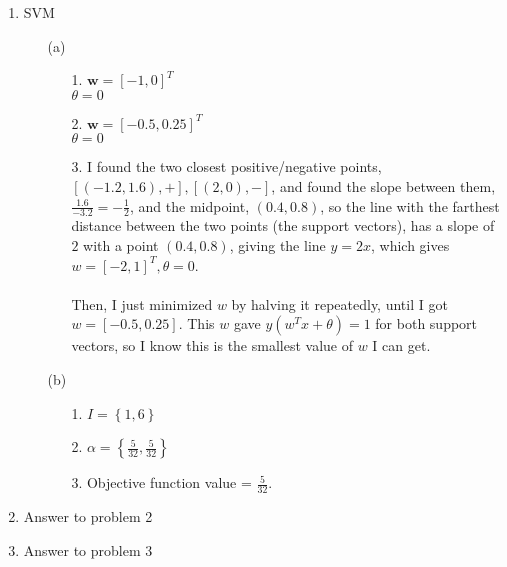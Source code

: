 

\oddsidemargin 0in
\evensidemargin 0in
\textwidth 6.5in
\topmargin -0.5in
\textheight 9.0in




\pagestyle{myheadings}  %

\begin{enumerate}
\item SVM
  \begin{enumerate}
  \item [(a)]
    \begin{enumerate}  
    \item [1.]
      $\textbf{w} = [-1,0]^T$\\
      $\theta = 0$
    \item [2.]
      $\textbf{w} = [-0.5,0.25]^T$\\
      $\theta = 0$
    \item [3.]
      I found the two closest positive/negative points, $[(-1.2,1.6), +], [(2,0), -]$, and found the slope between them, $\frac{1.6}{-3.2} = -\frac{1}{2}$, and the midpoint, $(0.4, 0.8)$, so the line with the farthest distance between the two points (the support vectors), has a slope of $2$ with a point $(0.4, 0.8)$, giving the line $y=2x$, which gives $w=[-2,1]^T, \theta=0$.\\\\
      Then, I just minimized $w$ by halving it repeatedly, until I got $w=[-0.5,0.25]$. This $w$ gave $y(w^Tx+\theta)=1$ for both support vectors, so I know this is the smallest value of $w$ I can get.      
    \end{enumerate}
  \item [(b)]
    \begin{enumerate}
    \item [1.]
      $I = \left\{1,6\right\}$
    \item [2.]
      $\alpha = \left\{\frac{5}{32},\frac{5}{32}\right\}$
    \item [3.]
      Objective function value = $\frac{5}{32}$.
    \end{enumerate}
  \end{enumerate}
\item Answer to problem 2
\item Answer to problem 3
\end{enumerate}



